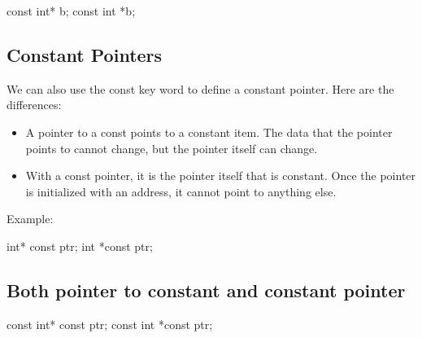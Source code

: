 \documentclass{report}
\begin{document}
    \begin{cppcode}
const int* b; 
const int *b;
    \end{cppcode}
    
    \bigbreak \noindent 
    \bigbreak \noindent 

    \pagebreak \bigbreak \noindent 
    \subsection{Constant Pointers}
    \bigbreak \noindent 
    We can also use the const key word to define a constant pointer. Here are the differences:
    \begin{itemize}
        \item A pointer to a const points to a constant item. The data that the pointer points to cannot change, but the pointer itself can change. 
        \item With a const pointer, it is the pointer itself that is constant.  Once the pointer is initialized with an address, it cannot point to anything else.
    \end{itemize}
    \bigbreak \noindent 
    Example:
    \bigbreak \noindent 
    
    \begin{cppcode}
int* const ptr;
int *const ptr;
    \end{cppcode}
    

    \bigbreak \noindent 
    \subsection{Both pointer to constant and constant pointer}
    \bigbreak \noindent 
    
    \begin{cppcode}
const int* const ptr;
const int *const ptr;
    \end{cppcode}
    

    \bigbreak \noindent 
\end{document}
